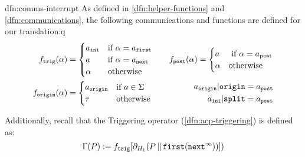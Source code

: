 \documentclass[../hons_project.tex]{subfiles}
\begin{document}
\begin{dfn}{dfn:comms-interrupt}{}
	As defined in \ref{dfn:helper-functions} and \ref{dfn:communications}, the following communications and functions are defined for our translation:q
	\begin{align*}
		f_{\mathtt{trig}}(\alpha) & = \begin{cases}
			                              a_{\mathtt{ini}} & \text{if } \alpha = a_{\mathtt{first}} \\
			                              a                & \text{if } \alpha = a_{\mathtt{next}}  \\
			                              \alpha           & \text{otherwise}
		                              \end{cases} \quad
		                          & f_{\mathtt{post}}(\alpha)             = \begin{cases}
			                                                                    a      & \text{ if } \alpha = a_{\mathrm{post}} \\
			                                                                    \alpha & \text{otherwise}
		                                                                    \end{cases}                                                   \\
		\fdef{origin}(\alpha)     & = \begin{cases}
			                              a_{\mathtt{origin}} & \text{if } a\in\Sigma \\
			                              \tau                & \text{otherwise}
		                              \end{cases}\quad
		                          & \begin{split}
			                            a_{\mathtt{origin}} | \mathtt{origin} & = a_{\mathtt{post}} \\ a_{\mathtt{ini}} | \mathtt{split} &= a_{\mathtt{post}}
		                            \end{split}
	\end{align*}

	\longrule{0.08ex}

	Additionally, recall that the Triggering operator (\ref{dfn:acp-triggering}) is defined as:
	\[\Gamma(P) := f_{\mathtt{trig}}[\partial_{H_{1}}(P \merge \mathtt{first}(\mathtt{next}^{\infty}))])\]
\end{dfn}
\end{document}
